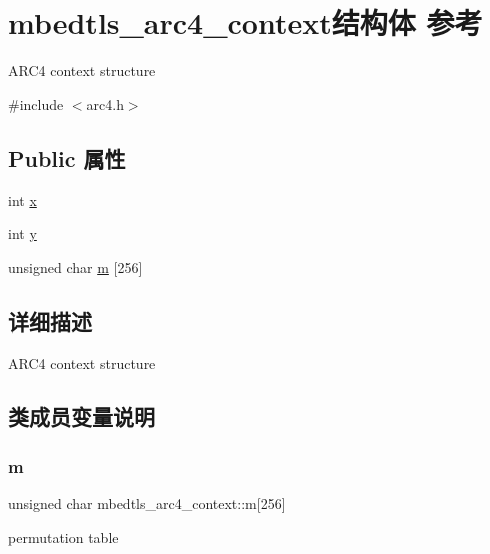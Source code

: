 \hypertarget{structmbedtls__arc4__context}{}\section{mbedtls\+\_\+arc4\+\_\+context结构体 参考}
\label{structmbedtls__arc4__context}


A\+R\+C4 context structure  




{\ttfamily \#include $<$arc4.\+h$>$}

\subsection*{Public 属性}
\begin{DoxyCompactItemize}
\item 
int \hyperlink{structmbedtls__arc4__context_a35ada04bd0e0ebb3c91fe0a7be91d62c}{x}
\item 
int \hyperlink{structmbedtls__arc4__context_a53d6a6d70c2b3ef5cd4467ae32e21429}{y}
\item 
unsigned char \hyperlink{structmbedtls__arc4__context_a18aed220cbc1645d368721b380354688}{m} \mbox{[}256\mbox{]}
\end{DoxyCompactItemize}


\subsection{详细描述}
A\+R\+C4 context structure 

\subsection{类成员变量说明}
\mbox{\label{structmbedtls__arc4__context_a18aed220cbc1645d368721b380354688}} 
\subsubsection{\texorpdfstring{m}{m}}
{\footnotesize\ttfamily unsigned char mbedtls\+\_\+arc4\+\_\+context\+::m\mbox{[}256\mbox{]}}

permutation table \mbox{\label{structmbedtls__arc4__context_a35ada04bd0e0ebb3c91fe0a7be91d62c}} 
